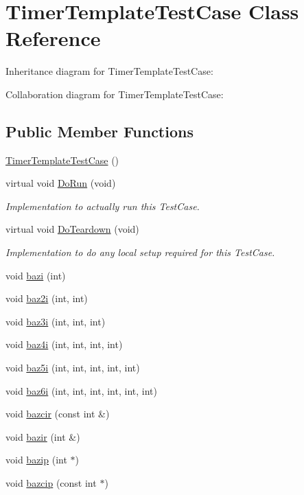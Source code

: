 \hypertarget{classTimerTemplateTestCase}{}\section{Timer\+Template\+Test\+Case Class Reference}
\label{classTimerTemplateTestCase}


Inheritance diagram for Timer\+Template\+Test\+Case\+:


Collaboration diagram for Timer\+Template\+Test\+Case\+:
\subsection*{Public Member Functions}
\begin{DoxyCompactItemize}
\item 
\hyperlink{classTimerTemplateTestCase_aab212ca3f4e29c5f6c2a2b31c43a89f7}{Timer\+Template\+Test\+Case} ()
\item 
virtual void \hyperlink{classTimerTemplateTestCase_a2fc717705ab61437ce7d36ced979a9d7}{Do\+Run} (void)
\begin{DoxyCompactList}\small\item\em Implementation to actually run this Test\+Case. \end{DoxyCompactList}\item 
virtual void \hyperlink{classTimerTemplateTestCase_a3d25351444dd284e3ead0626d092507c}{Do\+Teardown} (void)
\begin{DoxyCompactList}\small\item\em Implementation to do any local setup required for this Test\+Case. \end{DoxyCompactList}\item 
void \hyperlink{classTimerTemplateTestCase_a012f00e2728b209d18892b91e9ba5a2c}{bazi} (int)
\item 
void \hyperlink{classTimerTemplateTestCase_ac3067c8eb18a863f3931f50198821b80}{baz2i} (int, int)
\item 
void \hyperlink{classTimerTemplateTestCase_aaf7b4c1720dfda889117284c6a89ee3b}{baz3i} (int, int, int)
\item 
void \hyperlink{classTimerTemplateTestCase_abcf6053d67ea3c49abee23ecfb29cc6d}{baz4i} (int, int, int, int)
\item 
void \hyperlink{classTimerTemplateTestCase_af80c8ac3b7c58392086cc8036e0aa076}{baz5i} (int, int, int, int, int)
\item 
void \hyperlink{classTimerTemplateTestCase_aa86babfb3deba61fe5a130792d702509}{baz6i} (int, int, int, int, int, int)
\item 
void \hyperlink{classTimerTemplateTestCase_a1e096f8adda83ec6c7eb720e31001718}{bazcir} (const int \&)
\item 
void \hyperlink{classTimerTemplateTestCase_aae21644acc6b76fb94eca7afbd695333}{bazir} (int \&)
\item 
void \hyperlink{classTimerTemplateTestCase_a2593626c9184f7f926c073d92a7b7e2c}{bazip} (int $\ast$)
\item 
void \hyperlink{classTimerTemplateTestCase_ab285d509e893ae5dcbfddf46b337a105}{bazcip} (const int $\ast$)
\end{DoxyCompactItemize}
